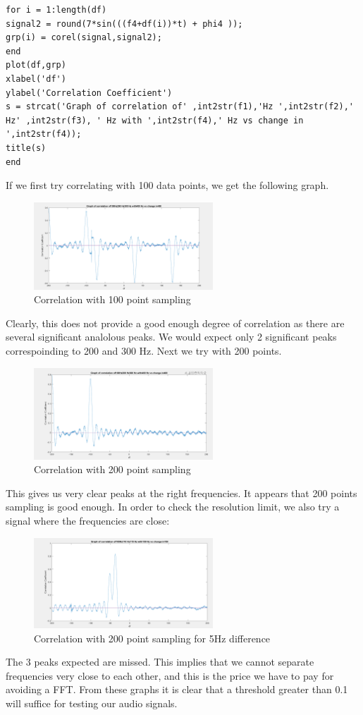 \begin{itemize}
\begin{lstlisting}
for i = 1:length(df)
signal2 = round(7*sin(((f4+df(i))*t) + phi4 ));
grp(i) = corel(signal,signal2);
end
plot(df,grp)
xlabel('df')
ylabel('Correlation Coefficient')
s = strcat('Graph of correlation of' ,int2str(f1),'Hz ',int2str(f2),' Hz' ,int2str(f3), ' Hz with ',int2str(f4),' Hz vs change in ',int2str(f4));
title(s)
end
\end{lstlisting}
If we first try correlating with 100 data points, we get the following graph.
\begin{figure}[ht]
    \centering
    \includegraphics[width=0.6\textwidth]{fig/Graph2100pts.PNG}
    \caption{Correlation with 100 point sampling}
    \label{fig:100pts}
\end{figure}
Clearly, this does not provide a good enough degree of correlation as there are
several significant analolous peaks. We would expect only 2 significant peaks
correspoinding to 200 and 300 Hz. Next we try with 200 points. 
\begin{figure}[ht]
    \centering
    \includegraphics[width=0.6\textwidth]{fig/Graph1.PNG}
    \caption{Correlation with 200 point sampling}
    \label{fig:100pts}
\end{figure}
This gives us very clear peaks at the right frequencies. It appears that 200
points sampling is good enough. In order to check the resolution limit, we also
try a signal where the frequencies are close: 
\begin{figure}[ht]
    \centering
    \includegraphics[width=0.6\textwidth]{fig/LowResolutionGraph3200ots.PNG}
    \caption{Correlation with 200 point sampling for 5Hz difference}
    \label{fig:200ptslowres}
\end{figure}
The 3 peaks expected are missed. This implies that we cannot separate
frequencies very close to each other, and this is the price we have to pay for
avoiding a FFT. From these graphs it is clear that a threshold greater than 0.1
will suffice for testing our audio signals. 

\end{itemize}